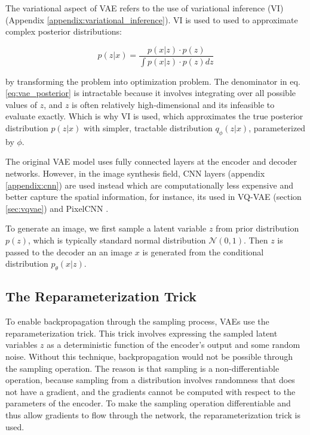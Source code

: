 The variational aspect of VAE refers to the use of variational inference (VI) (Appendix \ref{appendix:variational_inference}). VI is used to used to approximate complex posterior distributions: 

\begin{equation}
p(z|x) = \frac{p(x|z) \cdot p(z)}{\int p(x|z) \cdot p(z) dz}
\label{eq:vae_posterior}
\end{equation}

by transforming the problem into optimization problem. The denominator in eq. \ref{eq:vae_posterior} is intractable because it involves integrating over all possible values of $z$, and $z$ is often relatively high-dimensional and its infeasible to evaluate exactly. Which is why VI is used, which approximates the true posterior distribution $p(z|x)$ with simpler, tractable distribution $q_\phi (z|x)$, parameterized by $\phi$.

The original VAE model uses fully connected layers at the encoder and decoder networks. However, in the image synthesis field, CNN layers (appendix \ref{appendix:cnn}) are used instead which are computationally less expensive and better capture the spatial information, for instance, its used in VQ-VAE (section \ref{sec:vqvae}) and PixelCNN \cite{pixelcnn}.

To generate an image, we first sample a latent variable $z$ from prior distribution $p(z)$, which is typically standard normal distribution $\mathcal{N}(0, 1)$. Then $z$ is passed to the decoder an an image $x$ is generated from the conditional distribution $p_\theta (x|z)$. 

\subsection{The Reparameterization Trick}
To enable backpropagation through the sampling process, VAEs use the reparameterization trick. This trick involves expressing the sampled latent variables $z$ as a deterministic function of the encoder's output and some random noise. Without this technique, backpropagation would not be possible through the sampling operation. The reason is that sampling is a non-differentiable operation, because sampling from a distribution involves randomness that does not have a gradient, and the gradients cannot be computed with respect to the parameters of the encoder. To make the sampling operation differentiable and thus allow gradients to flow through the network, the reparameterization trick is used. 


